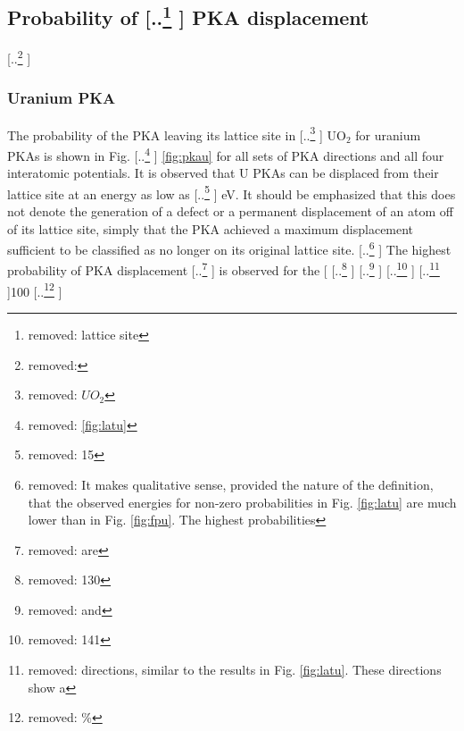 \documentclass[review]{elsarticle} %
\providecommand{\DIFaddtex}[1]{{\protect\color{blue} \sf #1}} %
\providecommand{\DIFdeltex}[1]{{\protect\color{red} [..\footnote{removed: #1} ]}} %
\providecommand{\DIFaddbegin}{} %
\providecommand{\DIFaddend}{} %
\providecommand{\DIFdelbegin}{} %
\providecommand{\DIFdelend}{} %
\providecommand{\DIFadd}[1]{\texorpdfstring{\DIFaddtex{#1}}{#1}} %
\providecommand{\DIFdel}[1]{\texorpdfstring{\DIFdeltex{#1}}{}} %
\newcommand{\DIFscaledelfig}{0.5}
\newlength{\DIFdelgraphicswidth} %
\newlength{\DIFdelgraphicsheight} %
\newcommand{\DIFaddincludegraphics}[2][]{{\color{blue}\fbox{\DIFOincludegraphics[#1]{#2}}}} %
\newcommand{\DIFdelincludegraphics}[2][]{%
\sbox{\DIFdelgraphicsbox}{\DIFOincludegraphics[#1]{#2}}%
\settoboxwidth{\DIFdelgraphicswidth}{\DIFdelgraphicsbox} %
\settoboxtotalheight{\DIFdelgraphicsheight}{\DIFdelgraphicsbox} %
\scalebox{\DIFscaledelfig}{%
\parbox[b]{\DIFdelgraphicswidth}{\usebox{\DIFdelgraphicsbox}\\[-\baselineskip] \rule{\DIFdelgraphicswidth}{0em}}\llap{\resizebox{\DIFdelgraphicswidth}{\DIFdelgraphicsheight}{%
\setlength{\unitlength}{\DIFdelgraphicswidth}%
\begin{picture}(1,1)%
\thicklines\linethickness{2pt} %
{\color[rgb]{1,0,0}\put(0,0){\framebox(1,1){}}}%
{\color[rgb]{1,0,0}\put(0,0){\line( 1,1){1}}}%
{\color[rgb]{1,0,0}\put(0,1){\line(1,-1){1}}}%
\end{picture}%
}\hspace*{3pt}}} %
} %
\DeclareRobustCommand{\DIFaddbegin}{\DIFOaddbegin \let\includegraphics\DIFaddincludegraphics} %
\DeclareRobustCommand{\DIFaddend}{\DIFOaddend \let\includegraphics\DIFOincludegraphics} %
\DeclareRobustCommand{\DIFdelbegin}{\DIFOdelbegin \let\includegraphics\DIFdelincludegraphics} %
\DeclareRobustCommand{\DIFdelend}{\DIFOaddend \let\includegraphics\DIFOincludegraphics} %
\begin{document}
\DIFaddend \subsection{Probability of \DIFdelbegin \DIFdel{lattice site }\DIFdelend \DIFaddbegin \DIFadd{PKA }\DIFaddend displacement}\DIFdelbegin \DIFdel{\hspace{5mm}
}\DIFdelend \DIFaddbegin \label{sect1}

\subsubsection{\DIFadd{Uranium PKA}}

\DIFaddend The probability of the PKA leaving its lattice site in \DIFdelbegin \DIFdel{$UO_2$ }\DIFdelend \DIFaddbegin \DIFadd{UO$_2$ }\DIFaddend for uranium PKAs is shown in Fig. \DIFdelbegin \DIFdel{\ref{fig:latu}}\DIFdelend \DIFaddbegin \DIFadd{\ref{fig:pkau} for all sets of PKA directions and all four interatomic potentials}\DIFaddend . It is observed that U PKAs can be displaced from their lattice site at an energy as low as \DIFdelbegin \DIFdel{15 }\DIFdelend \DIFaddbegin \DIFadd{10 }\DIFaddend eV. It should be emphasized that this does not denote the generation of a defect or a permanent displacement of an atom off of its lattice site, simply that the PKA achieved a maximum displacement sufficient to be classified as no longer on its original lattice site. \DIFdelbegin \DIFdel{It makes qualitative sense, provided the nature of the definition, that the observed energies for non-zero probabilities in Fig. \ref{fig:latu} are much lower than in Fig. \ref{fig:fpu}. The highest probabilities }\DIFdelend \DIFaddbegin \DIFadd{The highest probability }\DIFaddend of PKA displacement \DIFdelbegin \DIFdel{are }\DIFdelend \DIFaddbegin \DIFadd{is }\DIFaddend observed for the [\DIFdelbegin \DIFdel{130}%
\DIFdel{and }%
\DIFdel{141}%
\DIFdel{directions, similar to the results in Fig. \ref{fig:latu}. These directions show a }\DIFdelend 100\DIFdelbegin %
\DIFdel{\%}%
\end{document}
